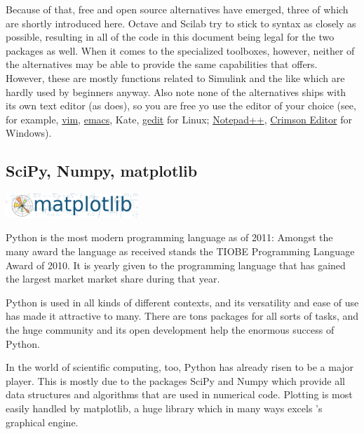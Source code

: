 Because of that, free and open source \matlab{} alternatives have emerged,
three of which are shortly introduced here. Octave and Scilab try to stick to
\matlab{} syntax as closely as possible, resulting in all of the code in this
document being legal for the two packages as well.  When it comes to the
specialized toolboxes, however, neither of the alternatives may be able to
provide the same capabilities that \matlab{} offers. However, these are mostly
functions related to Simulink and the like which are hardly used by beginners
anyway.  Also note none of the alternatives ships with its own text editor (as
\matlab{} does), so you are free yo use the editor of your choice (see, for
example, \href{http://www.vim.org/}{vim},
\href{http://www.gnu.org/software/emacs/}{emacs}, Kate,
\href{http://projects.gnome.org/gedit/}{gedit} for Linux;
\href{http://notepad-plus.sourceforge.net/uk/site.htm}{Notepad++},
\href{http://www.crimsoneditor.com/}{Crimson Editor} for Windows).

\subsection{SciPy, Numpy, matplotlib}

\begin{floatingfigure}[r]{5cm}
\centering
\includegraphics[width=5cm]{figures/matplotlib.png}
\end{floatingfigure}

Python is the most modern programming language as of 2011: Amongst the many
award the language as received stands the TIOBE Programming Language Award of
2010. It is yearly given to the programming language that has gained the
largest market market share during that year.

Python is used in all kinds of different contexts, and its versatility and
ease of use has made it attractive to many. There are tons packages for all
sorts of tasks, and the huge community and its open development help the
enormous success of Python.

In the world of scientific computing, too, Python has already risen to be a
major player. This is mostly due to the packages SciPy and Numpy which provide
all data structures and algorithms that are used in numerical code. Plotting
is most easily handled by matplotlib, a huge library which in many ways excels
\matlab{}'s graphical engine.

